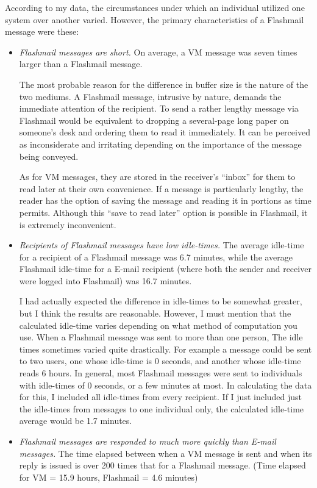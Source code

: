 According to my data, the circumstances under which an individual utilized
one system over another varied.  However, the primary characteristics of a
Flashmail message were these:
\begin{itemize}
\item \textsl{Flashmail messages are short.}  On average, a VM message was seven
  times larger than a Flashmail message.

  The most probable reason for the difference in buffer size is the nature
  of the two mediums.  A Flashmail message, intrusive by nature, demands the
  immediate attention of the recipient.  To send a rather lengthy message
  via Flashmail would be equivalent to dropping a several-page long paper
  on someone's desk and ordering them to read it immediately. It can be
  perceived as inconsiderate and irritating depending on the importance of
  the message being conveyed.

  As for VM messages, they are stored in the receiver's ``inbox'' for them
  to read later at their own convenience.  If a message is particularly
  lengthy, the reader has the option of saving the message and reading it
  in portions as time permits.  Although this ``save to read later'' option
  is possible in Flashmail, it is extremely inconvenient.

\item \textsl{Recipients of Flashmail messages have low idle-times.}  The average
  idle-time for a recipient of a Flashmail message was 6.7 minutes, while
  the average Flashmail idle-time for a E-mail recipient (where both the
  sender and receiver were logged into Flashmail) was 16.7 minutes.

  I had actually expected the difference in idle-times to be somewhat
  greater, but I think the results are reasonable.  However, I must mention
  that the calculated idle-time varies depending on what method of
  computation you use.  When a Flashmail message was sent to more than one
  person, The idle times sometimes varied quite drastically.  For example a
  message could be sent to two users, one whose idle-time is 0 seconds, and
  another whose idle-time reads 6 hours.  In general, most Flashmail
  messages were sent to individuals with idle-times of 0 seconds, or a few
  minutes at most. In calculating the data for this, I included all
  idle-times from every recipient.  If I just included just the idle-times
  from messages to one individual only, the calculated idle-time average
  would be 1.7 minutes.

\item \textsl{Flashmail messages are responded to much more quickly than E-mail
  messages.}  The time elapsed between when a VM message is sent and when
  its reply is issued is over 200 times that for a Flashmail message.
  (Time elapsed for VM = 15.9 hours, Flashmail = 4.6 minutes)


\end{itemize}
